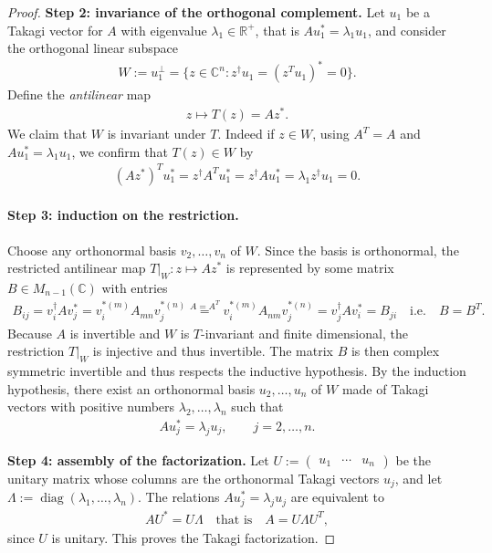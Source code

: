 \documentclass[../QFT_main.tex]{subfiles}
\begin{document}
\begin{proof}
\noindent
\textbf{Step 2: invariance of the orthogonal complement.}
Let $u_1$ be a Takagi vector for $A$ with eigenvalue $\lambda_1\in\mathbb{R}^+$, that is $Au_1^*=\lambda_1u_1$, and consider the orthogonal linear subspace
\begin{align}
    W := u_1^\perp = \{ z \in \mathbb{C}^n : z^\dagger u_1= (z^T u_1)^*=0 \}.
\end{align}
Define the \emph{antilinear} map
\begin{align}
    z\mapsto T(z)=A z^*.
\end{align}
We claim that $W$ is invariant under $T$. Indeed if $z \in W$, using $A^T = A$ and $A u_1^* = \lambda_1 u_1$, we confirm that $T(z) \in W$ by
\begin{align}
    (Az^*)^T u_1^*= z^\dagger A^T u_1^* = z^\dagger A u_1^* = \lambda_1 z^\dagger u_1=0.
\end{align}

\paragraph{Step 3: induction on the restriction.}
Choose any orthonormal basis  $v_2,\dots,v_n$ of $W$.
Since the basis is orthonormal, the restricted antilinear map $T|_W:z\mapsto Az^*$ is represented by some matrix $B \in M_{n-1}(\mathbb{C})$ with entries 
\begin{align}
    B_{ij} = v_i^\dagger A v_j^* = v_i^{*(m)} A_{mn}v_j^{*(n)} \overset{A=A^T}{=} v_i^{*(m)} A_{nm}v_j^{*(n)} =  v_j^\dagger A v_i^* = B_{ji}\quad \text{i.e.}\quad B=B^T.
\end{align}
Because $A$ is invertible and $W$ is $T$-invariant and finite dimensional, the restriction $T|_W$ is injective and thus invertible. The matrix $B$ is then complex symmetric invertible and thus respects the inductive hypothesis.
By the induction hypothesis, there exist an orthonormal basis $u_2,\dots,u_n$ of $W$ made of Takagi vectors with positive numbers $\lambda_2,\dots,\lambda_n$ such that
\begin{align}
    A u_j^* = \lambda_j u_j,\qquad j = 2,\dots,n.
\end{align}

\noindent
\textbf{Step 4: assembly of the factorization.}
Let $U := \begin{pmatrix} u_1 & \cdots & u_n \end{pmatrix}$ be the unitary matrix whose columns are the orthonormal Takagi vectors $u_j$, and let $\Lambda := \operatorname{diag}(\lambda_1,\dots,\lambda_n)$.
The relations $A u^*_j = \lambda_j u_j$ are equivalent to
\begin{align}
    A U^* = U \Lambda \quad \text{that is}\quad A = U \Lambda U^T,
\end{align}
since $U$ is unitary. This proves the Takagi factorization.


\end{proof}
\end{document}
